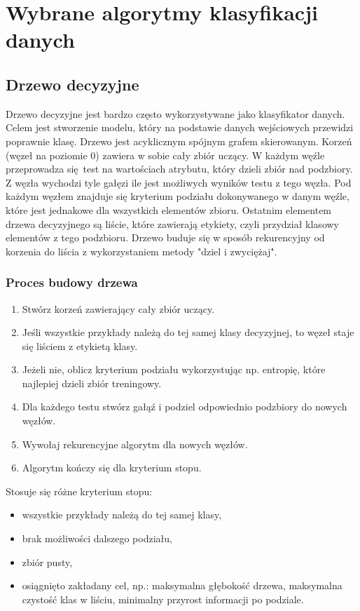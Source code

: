 \section{Wybrane algorytmy klasyfikacji danych}
\subsection{Drzewo decyzyjne}
Drzewo decyzyjne jest bardzo często wykorzystywane jako klasyfikator danych. Celem jest stworzenie modelu, który na podstawie danych wejściowych przewidzi poprawnie klasę. Drzewo jest acyklicznym spójnym grafem skierowanym. Korzeń (węzeł na poziomie 0) zawiera w sobie cały zbiór uczący. W każdym węźle przeprowadza się test na wartościach atrybutu, który dzieli zbiór nad podzbiory. Z węzła wychodzi tyle gałęzi ile jest możliwych wyników testu z tego węzła. Pod każdym węzłem znajduje się kryterium podziału dokonywanego w danym węźle, które jest jednakowe dla wszystkich elementów zbioru. Ostatnim elementem drzewa decyzyjnego są liście, które zawierają etykiety, czyli przydział klasowy elementów z tego podzbioru. Drzewo buduje się w sposób rekurencyjny od korzenia do liścia z wykorzystaniem metody "dziel i zwyciężaj".\\
\subsubsection{Proces budowy drzewa}
\begin{enumerate}
	\item Stwórz korzeń zawierający cały zbiór uczący.
	\item Jeśli wszystkie przykłady należą do tej samej klasy decyzyjnej, to węzeł staje się liściem z etykietą klasy.
	\item Jeżeli nie, oblicz kryterium podziału wykorzystując np. entropię, które najlepiej dzieli zbiór treningowy.
	\item Dla każdego testu stwórz gałąź i podziel odpowiednio podzbiory do nowych węzłów.
	\item Wywołaj rekurencyjne algorytm dla nowych węzłów.
	\item Algorytm kończy się dla kryterium stopu.
\end{enumerate}
Stosuje się różne kryterium stopu:
\begin{itemize}
	\item wszystkie przykłady należą do tej samej klasy,
	\item brak możliwości dalszego podziału,
	\item zbiór pusty,
	\item osiągnięto zakładany cel, np.: maksymalna głębokość drzewa, maksymalna czystość klas w liściu, minimalny przyrost informacji po podziale.
\end{itemize}


